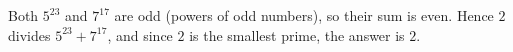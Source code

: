 Both $5^{23}$ and $7^{17}$ are odd (powers of odd numbers), so their sum is even. Hence $2$ divides $5^{23}+7^{17}$, and since $2$ is the smallest prime, the answer is $\boxed{2}$.
